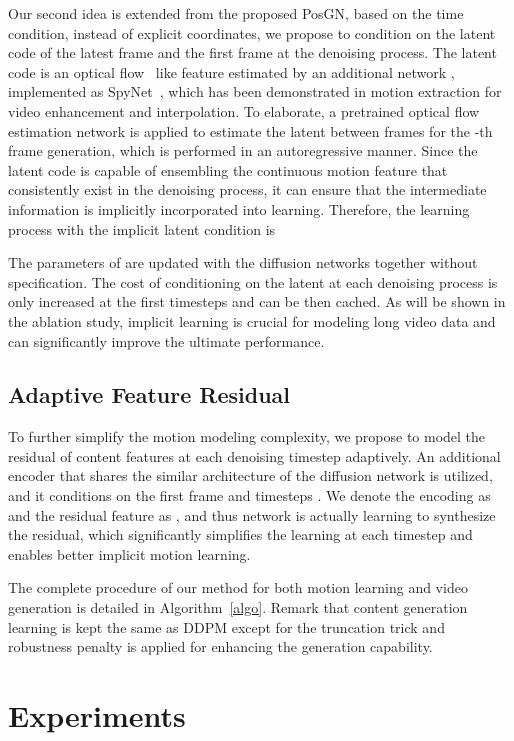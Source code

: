\documentclass[letterpaper]{article}
\begin{document}
Our second idea is extended from the proposed PosGN, based on the time condition, instead of explicit coordinates, we propose to condition on the latent code of the latest frame and the first frame at the denoising process.
The latent code is an optical flow~\cite{horn1981determining} like feature estimated by an additional network , implemented as SpyNet~\cite{ranjan2017optical}, which has been demonstrated in motion extraction for video enhancement and interpolation.
To elaborate, a pretrained optical flow estimation network  is applied to estimate the latent  between frames  for the -th frame  generation, which is performed in an autoregressive manner.
Since the latent code is capable of ensembling the continuous motion feature that consistently exist in the denoising process, it can ensure that the intermediate information is implicitly incorporated into learning.
Therefore, the learning process with the implicit latent condition is 

The parameters of  are updated with the diffusion networks together without specification.
The cost of conditioning on the latent at each denoising process is only increased at the first timesteps and can be then cached.
As will be shown in the ablation study, implicit learning is crucial for modeling long video data and can significantly improve the ultimate performance.

\subsection{Adaptive Feature Residual}
To further simplify the motion modeling complexity, we propose to model the residual of content features at each denoising timestep adaptively.
An additional encoder that shares the similar architecture of the diffusion network is utilized, and it conditions on the first frame  and timesteps .
We denote the encoding as  and the residual feature as , and thus network  is actually learning to synthesize the residual, which significantly simplifies the learning at each timestep and enables better implicit motion learning.

The complete procedure of our method for both motion learning and video generation is detailed in Algorithm~\ref{algo}.
Remark that content generation learning is kept the same as DDPM except for the truncation trick and robustness penalty is applied for enhancing the generation capability.

\section{Experiments}
\end{document}
